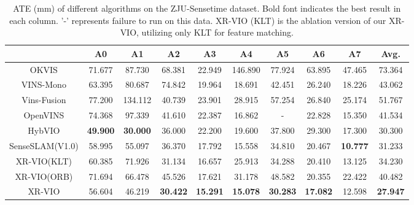 \begin{table*}[h]

    \caption{ATE (mm)  of different algorithms on the ZJU-Sensetime dataset. Bold font indicates the best result in each column. '-' represents failure to run on this data. XR-VIO (KLT) is the ablation version of our XR-VIO, utilizing only KLT for feature matching.}
    \centering
    \begin{tabular}{cccccccccc}
    \toprule
         &  A0&  A1&  A2&  A3&  A4&  A5&  A6&  A7& Avg.\\
         \midrule
         OKVIS\protect\footnotemark[1]          &  71.677 & 87.730 & 68.381 & 22.949 &  146.890 & 77.924 & 63.895 & 47.465 & 73.364 \\
         VINS-Mono\protect\footnotemark[1]      &  63.395 & 80.687 & 74.842 & 19.964 & 18.691 & 42.451 & 26.240 &  18.226 & 43.062 \\
         Vins-Fusion\protect\footnotemark[3]&  77.200 & 134.112 & 40.739 & 23.901 & 28.915 & 57.254 & 26.840 & 25.174 & 51.767\\
         OpenVINS\protect\footnotemark[3]& 74.368 & 97.339 & 41.610 & 22.387 & 16.862 & -   & 22.828 & 15.350 & 41.534\\
         HybVIO\protect\footnotemark[2]         &  \textbf{49.900}&  \textbf{30.000 }&  36.000&  22.200&  19.600&  37.800&  29.300&  17.300& 30.300\\
         SenseSLAM(V1.0)\protect\footnotemark[1]&  58.995 & 55.097 & 36.370 & 17.792 & 15.558 & 34.810 & 20.467 & \textbf{10.777} & 31.233\\
\hline
         XR-VIO(KLT)\protect\footnotemark[3]    &  \phantom{1}60.385\phantom{1} &  \phantom{1}71.926\phantom{1} &  \phantom{1}31.134\phantom{1} &  \phantom{1}16.657\phantom{1} &  \phantom{1}25.913\phantom{1} &  \phantom{1}34.288\phantom{1} &  \phantom{1}20.410\phantom{1} &  \phantom{1}13.125\phantom{1} & \phantom{1}34.230\phantom{1} \\
         XR-VIO(ORB)\protect\footnotemark[3]& 71.694 & 66.478 & 45.526 & 17.621 & 31.178 & 48.582 & 20.355 & 22.422 & 40.482\\
        XR-VIO\protect\footnotemark[3]          &  56.604 &  46.219 & \textbf{30.422} & \textbf{15.291}& \textbf{15.078}&  \textbf{30.283}& \textbf{17.082}&  12.598 & \textbf{27.947}\\
        \bottomrule
    \end{tabular}
    
    \label{tab:ATE_ZJU}
\end{table*}

